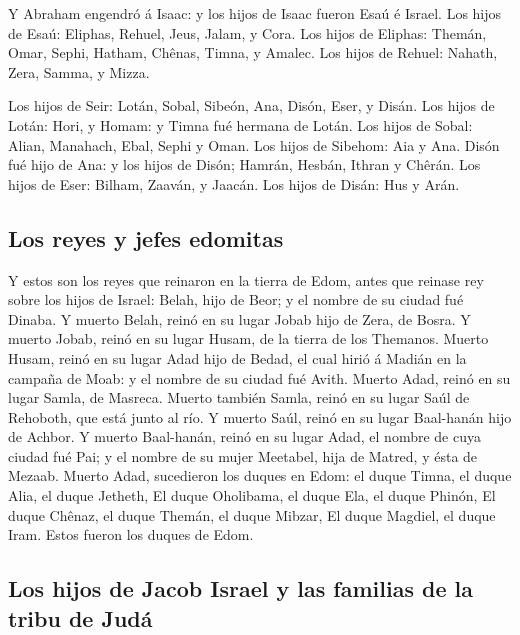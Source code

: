  Y Abraham engendró á Isaac: y los hijos de Isaac fueron
Esaú é Israel.  Los hijos de Esaú: Eliphas, Rehuel, Jeus,
Jalam, y Cora.  Los hijos de Eliphas: Themán, Omar,
Sephi, Hatham, Chênas, Timna, y Amalec.  Los hijos de
Rehuel: Nahath, Zera, Samma, y Mizza.

 Los hijos de Seir: Lotán, Sobal, Sibeón, Ana, Disón,
Eser, y Disán.  Los hijos de Lotán: Hori, y Homam: y
Timna fué hermana de Lotán.  Los hijos de Sobal: Alian,
Manahach, Ebal, Sephi y Oman. Los hijos de Sibehom: Aia y Ana.
 Disón fué hijo de Ana: y los hijos de Disón; Hamrán,
Hesbán, Ithran y Chêrán.  Los hijos de Eser: Bilham,
Zaaván, y Jaacán. Los hijos de Disán: Hus y Arán.

\hypertarget{los-reyes-y-jefes-edomitas}{%
\subsection{Los reyes y jefes
edomitas}\label{los-reyes-y-jefes-edomitas}}

 Y estos son los reyes que reinaron en la tierra de Edom,
antes que reinase rey sobre los hijos de Israel: Belah, hijo de Beor; y
el nombre de su ciudad fué Dinaba.  Y muerto Belah, reinó
en su lugar Jobab hijo de Zera, de Bosra.  Y muerto
Jobab, reinó en su lugar Husam, de la tierra de los Themanos.
 Muerto Husam, reinó en su lugar Adad hijo de Bedad, el
cual hirió á Madián en la campaña de Moab: y el nombre de su ciudad fué
Avith.  Muerto Adad, reinó en su lugar Samla, de Masreca.
 Muerto también Samla, reinó en su lugar Saúl de
Rehoboth, que está junto al río.  Y muerto Saúl, reinó en
su lugar Baal-hanán hijo de Achbor.  Y muerto Baal-hanán,
reinó en su lugar Adad, el nombre de cuya ciudad fué Pai; y el nombre de
su mujer Meetabel, hija de Matred, y ésta de Mezaab. 
Muerto Adad, sucedieron los duques en Edom: el duque Timna, el duque
Alia, el duque Jetheth,  El duque Oholibama, el duque
Ela, el duque Phinón,  El duque Chênaz, el duque Themán,
el duque Mibzar,  El duque Magdiel, el duque Iram. Estos
fueron los duques de Edom.

\hypertarget{los-hijos-de-jacob-israel-y-las-familias-de-la-tribu-de-juduxe1}{%
\subsection{Los hijos de Jacob Israel y las familias de la tribu de
Judá}\label{los-hijos-de-jacob-israel-y-las-familias-de-la-tribu-de-juduxe1}}


